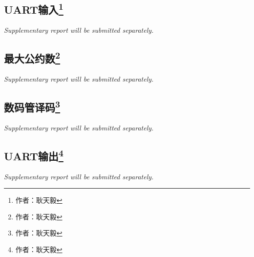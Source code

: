 \documentclass{article}
\begin{document}
        \subsection{UART输入\protect\footnote{作者：耿天毅}}
            \emph{Supplementary report will be submitted separately.}
            
        \subsection{最大公约数\protect\footnote{作者：耿天毅}}
            \emph{Supplementary report will be submitted separately.}
            
        \subsection{数码管译码\protect\footnote{作者：耿天毅}}
            \emph{Supplementary report will be submitted separately.}
            
        \subsection{UART输出\protect\footnote{作者：耿天毅}}
            \emph{Supplementary report will be submitted separately.}
            
\end{document}

